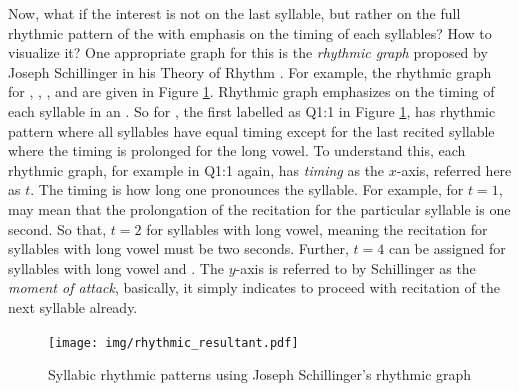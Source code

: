 Now, what if the interest is not on the last syllable, but rather on the full rhythmic pattern of the   with emphasis on the timing of each syllables? How to visualize it? One appropriate graph for this is the \textit{rhythmic graph} proposed by Joseph Schillinger in his Theory of Rhythm \cite{schillinger1946schillinger}. For example, the rhythmic graph for  ,  ,  , and   are given in Figure \ref{fig:result_syllabic_rhythmic_graph}. Rhythmic graph emphasizes on the timing of each syllable in an  . So for  , the first   labelled as Q1:1 in Figure \ref{fig:result_syllabic_rhythmic_graph}, has rhythmic pattern where all syllables have equal timing except for the last recited syllable where the timing is prolonged for the long vowel. To understand this, each rhythmic graph, for example in Q1:1 again, has \textit{timing} as the $x$-axis, referred here as $t$. The timing is how long one pronounces the syllable. For example, for $t=1$, may mean that the prolongation of the recitation for the particular syllable is one second. So that, $t=2$ for syllables with long vowel, meaning the recitation for syllables with long vowel must be two seconds. Further, $t=4$ can be assigned for syllables with long vowel and  . The $y$-axis is referred to by Schillinger as the \textit{moment of attack}, basically, it simply indicates to proceed with recitation of the next syllable already. 

\begin{figure}[!t]
    \centering
    \texttt{[image: img/rhythmic\_resultant.pdf]}
    \caption{Syllabic rhythmic patterns using Joseph Schillinger's rhythmic graph}
    \label{fig:result_syllabic_rhythmic_graph}
\end{figure}


